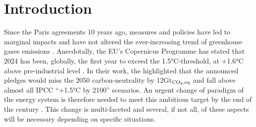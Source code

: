 \documentclass[11pt,twoside,a4paper,english]{article}
\begin{document}
\section{Introduction}
\label{sec:intro}
Since the Paris agreements 10 years ago, measures and policies have led to marginal impacts and have not altered the ever-increasing trend of greenhouse gases emissions \cite{ourwold_CO2}. Anecdotally, the EU’s Copernicus Programme has stated that 2024 has been, globally, the first year to exceed the 1.5°C-threshold, at +1.6°C above pre-industrial level \cite{Copernicus_2024}. In their work, the \citet{IEA_APS} highlighted that the announced pledges would miss the 2050 carbon-neutrality by 12Gt$_{\ce{CO2},\text{eq}}$ and fall above almost all IPCC ``+1.5$°$C by 2100'' scenarios. An urgent change of paradigm of the energy system is therefore needed to meet this ambitious target by the end of the century \cite{iea_2019}. This change is multi-faceted and several, if not all, of these aspects will be necessary depending on specific situations. 
\end{document}

